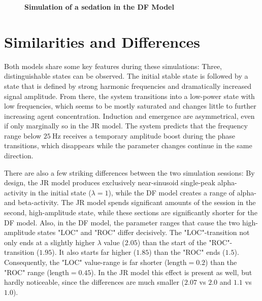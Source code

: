 \begin{figure}[H]

\caption{\textbf{Simulation of a sedation in the DF Model}
}\label{fig:sedation_sim_df}
\end{figure}

\section{Similarities and Differences}
    Both models share some key features during these simulations:
    Three, distinguishable states can be observed.
    The initial stable state is followed by a state that is defined by strong harmonic frequencies and dramatically
    increased signal amplitude.
    From there, the system transitions into a low-power state with low frequencies,
    which seems to be mostly saturated and changes little to further increasing agent concentration.
    Induction and emergence are asymmetrical, even if only marginally so in the JR model.
    The system predicts that the frequency range below $\SI{25}{\hertz}$ receives a temporary amplitude boost during
    the phase transitions, which disappears while the parameter changes continue in the same direction.


There are also a few striking differences between the two simulation sessions:
By design,
the JR model produces exclusively near-sinusoid single-peak alpha-activity in the initial state ($\lambda = 1$),
while the DF model creates a range of alpha- and beta-activity.
The JR model spends significant amounts of the session in the second, high-amplitude state,
while these sections are significantly shorter for the DF model.
Also, in the DF model,
the parameter ranges that cause the two high-amplitude states "LOC" and "ROC" differ decisively.
The "LOC"-transition not only ends at a slightly higher $\lambda$ value ($2.05$) than the start of the
"ROC"-transition ($1.95$).
It also starts far higher ($1.85$) than the "ROC" ends ($1.5$).
Consequently, the "LOC" value-range is far shorter ($\text{length}=0.2$) than the "ROC" range
($\text{length}=0.45$).
In the JR model this effect is present as well, but hardly noticeable,
since the differences are much smaller ($2.07$ vs $2.0$ and $1.1$ vs $1.0$).



